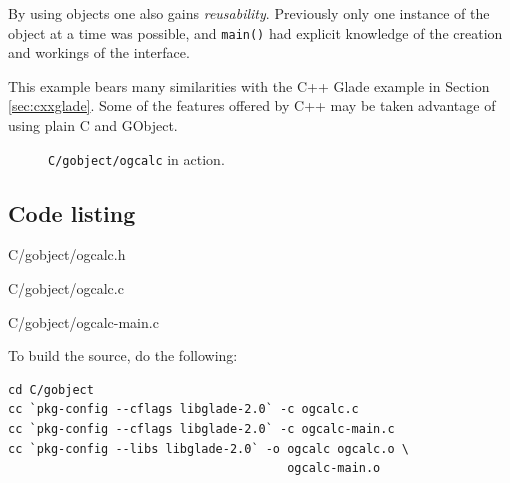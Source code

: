 \documentclass[a4paper,oneside]{article}
\newcommand{\filename}[1]{\texttt{#1}}
\newcommand{\program}[1]{\texttt{#1}}
\newcommand{\function}[1]{\texttt{#1()}}
\begin{document}
By using objects one also gains \emph{reusability}.  Previously only
one instance of the object at a time was possible, and \function{main}
had explicit knowledge of the creation and workings of the interface.

This example bears many similarities with the C++ Glade example in
Section \ref{sec:cxxglade}.  Some of the features offered by C++ may
be taken advantage of using plain C and GObject.

\begin{figure}
  \centering
  \caption[\program{C/gobject/ogcalc} in action]{\program{C/gobject/ogcalc} in
    action.}
  \label{fig:ogcalcgo}
\end{figure}

\subsection{Code listing}


                 {C/gobject/ogcalc.h}


                 {C/gobject/ogcalc.c}


                 {C/gobject/ogcalc-main.c}

To build the source, do the following:

\begin{verbatim}
cd C/gobject
cc `pkg-config --cflags libglade-2.0` -c ogcalc.c
cc `pkg-config --cflags libglade-2.0` -c ogcalc-main.c
cc `pkg-config --libs libglade-2.0` -o ogcalc ogcalc.o \
                                       ogcalc-main.o
\end{verbatim}
\end{document}

